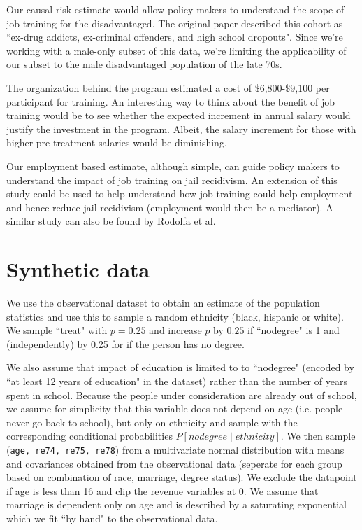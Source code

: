 \documentclass[12pt]{article}
\begin{document}
Our causal risk estimate would allow policy makers to understand the scope of job training for the disadvantaged. The original paper described this cohort as ``ex-drug addicts, ex-criminal offenders, and high school dropouts". Since we're working with a male-only subset of this data, we're limiting the applicability of our subset to the male disadvantaged population of the late 70s.

The organization behind the program estimated a cost of \$6,800-\$9,100 per participant for training. An interesting way to think about the benefit of job training would be to see whether the expected increment in annual salary would justify the investment in the program. Albeit, the salary increment for those with higher pre-treatment salaries would be diminishing.

Our employment based estimate, although simple, can guide policy makers to understand the impact of job training on jail recidivism. An extension of this study could be used to help understand how job training could help employment and hence reduce jail recidivism (employment would then be a mediator). A similar study can also be found by Rodolfa et al. \cite{rodolfa2020case}

\section{Synthetic data} \label{sec:synthetic}

We use the observational dataset to obtain an estimate of the population statistics and use this to sample a random ethnicity (black, hispanic or white). We sample ``treat" with $p=0.25$ and increase $p$ by $0.25$ if ``nodegree" is 1 and (independently) by 0.25 for if the person has no degree.

We also assume that impact of education is limited to to ``nodegree" (encoded by ``at least 12 years of education" in the dataset) rather than the number of years spent in school. Because the people under consideration are already out of school, we assume for simplicity that this variable does not depend on age (i.e. people never go back to school), but only on ethnicity and sample with the corresponding conditional probabilities $P[nodegree \mid ethnicity]$. We then sample ({\tt age, re74, re75, re78}) from a multivariate normal distribution with means and covariances obtained from the observational data (seperate for each group based on combination of race, marriage, degree status). We exclude the datapoint if age is less than 16 and clip the revenue variables at $0$. We assume that marriage is dependent only on age and is described by a saturating exponential which we fit ``by hand" to the observational data.
\end{document}
